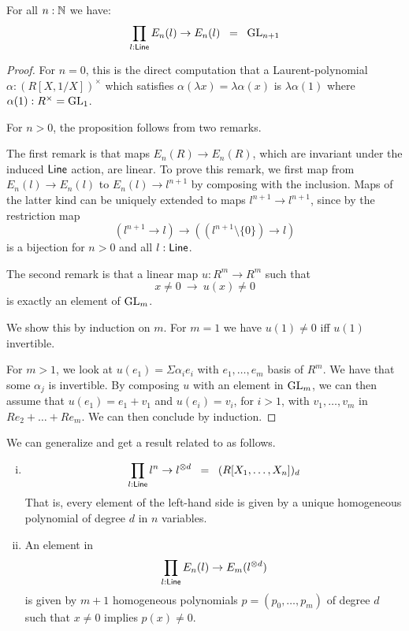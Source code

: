 \begin{proposition}\label{aut}
  For all $n:\mathbb{N}$ we have:
$$\prod_{l:\mathsf{Line}}E_n(l)\rightarrow E_n(l) \;\;=\;\; \operatorname{GL}_{n+1}$$
\end{proposition}

\begin{proof}
  For $n=0$, this is the direct computation that a Laurent-polynomial $\alpha:(R[X,1/X])^\times$ which satisfies
  $\alpha(\lambda x)=\lambda \alpha(x)$ is $\lambda\alpha(1)$ where $\alpha(1):R^\times=\operatorname{GL}_1$.
  
  \medskip
  
  For $n>0$, the proposition follows from two remarks.

  The first remark is that maps $E_n(R)\to E_n(R)$, which are invariant under the induced $\mathsf{Line}$ action, are linear.
  To prove this remark, we first map from $E_n(l)\to E_n(l)$ to $E_n(l)\to l^{n+1}$ by composing with the inclusion.
  Maps of the latter kind can be uniquely extended to maps $l^{n+1}\to l^{n+1}$, since by 
   the restriction map
$$
(l^{n+1}\rightarrow l)\rightarrow ((l^{n+1}\setminus\{0\})\rightarrow l)
$$
is a bijection for $n>0$ and all $l:\mathsf{Line}$.

\medskip

The second remark is that a linear map $u:R^{m}\rightarrow R^{m}$ such that
$$
x\neq 0~\rightarrow~u(x)\neq 0
$$
is exactly an element of $\operatorname{GL}_{m}$.

We show this by induction on $m$. For $m=1$ we have $u(1)\neq 0$ iff $u(1)$ invertible.

For $m>1$, we look at $u(e_1) = \Sigma \alpha_ie_i$ with $e_1,\dots,e_m$ basis of $R^m$.
We have that some $\alpha_j$ is invertible.
By composing $u$ with an element in $\operatorname{GL}_m$, we can then
assume that $u(e_1) = e_1+v_1$ and $u(e_i) = v_i$, for $i>1$, with $v_1,\dots,v_m$ in $Re_2+\dots+Re_m$.
We can then conclude by induction.
\end{proof}

We can generalize 
and get a result related to  as follows.
 
\begin{lemma}\label{hom}
  \begin{enumerate}[(i)]
    \item
      \[  \prod_{l:\mathsf{Line}}l^n\rightarrow l^{\otimes d} \;\;=\;\; (R[X_1, \dots, X_n])_d \]
      That is,
      every element of the left-hand side is given by
      a unique homogeneous polynomial of degree $d$ in $n$ variables.
    \item
      An element in
      $$\prod_{l:\mathsf{Line}}E_n(l)\rightarrow E_m(l^{\otimes d})$$
      is given by $m+1$ homogeneous polynomials $p = (p_0,\dots,p_m)$ of degree $d$ such that
      $x\neq 0$ implies $p(x)\neq 0$.
  \end{enumerate}
\end{lemma}

